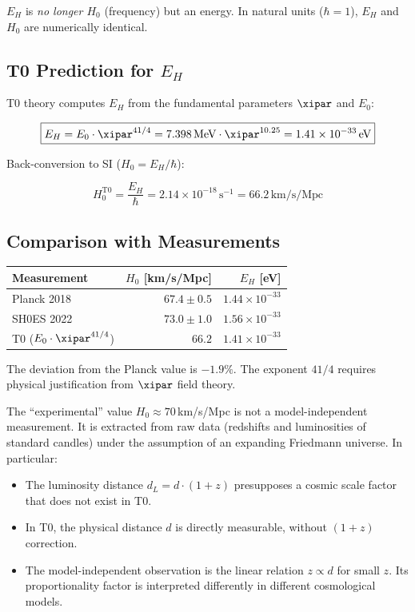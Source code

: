 $E_H$ is \emph{no longer $H_0$} (frequency) but an energy. 
In natural units ($\hbar = 1$), $E_H$ and $H_0$ are 
numerically identical.

\subsection{T0 Prediction for $E_H$}

T0 theory computes $E_H$ from the fundamental parameters 
$\xipar$ and $E_0$:

\begin{equation}
\boxed{E_H = E_0 \cdot \xipar^{41/4} = 7.398\,\text{MeV} \cdot \xipar^{10.25} = 1.41 \times 10^{-33}\,\text{eV}}
\label{eq:E_H_T0}
\end{equation}

Back-conversion to SI ($H_0 = E_H / \hbar$):

\begin{equation}
H_0^{\text{T0}} = \frac{E_H}{\hbar} = 2.14 \times 10^{-18}\,\text{s}^{-1} = 66.2\,\text{km/s/Mpc}
\end{equation}

\subsection{Comparison with Measurements}

\begin{center}
\begin{tabular}{lrr}
\toprule
Measurement & $H_0$ [km/s/Mpc] & $E_H$ [eV] \\
\midrule
Planck 2018 & $67.4 \pm 0.5$ & $1.44 \times 10^{-33}$ \\
SH0ES 2022 & $73.0 \pm 1.0$ & $1.56 \times 10^{-33}$ \\
T0 ($E_0 \cdot \xipar^{41/4}$) & $66.2$ & $1.41 \times 10^{-33}$ \\
\bottomrule
\end{tabular}
\end{center}

The deviation from the Planck value is $-1.9\%$. The exponent $41/4$ 
requires physical justification from $\xipar$ field theory.

\begin{remark}
	The ``experimental'' value $H_0 \approx 70\,$km/s/Mpc is not a 
	model-independent measurement. It is extracted from raw data (redshifts 
	and luminosities of standard candles) under the assumption of an expanding 
	Friedmann universe. In particular:
	\begin{itemize}
	\item The luminosity distance $d_L = d \cdot (1+z)$ presupposes a 
	cosmic scale factor that does not exist in T0.
	\item In T0, the physical distance $d$ is directly measurable, without 
	$(1+z)$ correction.
	\item The model-independent observation is the linear relation 
	$z \propto d$ for small $z$. Its proportionality factor is interpreted 
	differently in different cosmological models.
	\end{itemize}
\end{remark}


